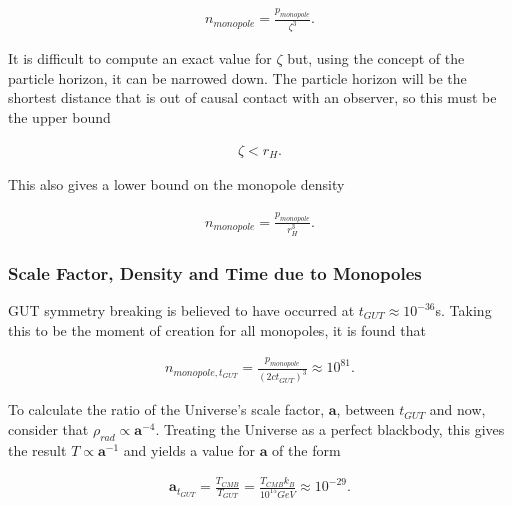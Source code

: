 \documentclass[fleqn, twocolumn, 10pt]{article}
\begin{document}
\begin{ceqn}
\begin{align*}
n_{monopole} = \frac{p_{monopole}}{\zeta^{3}}.
\end{align*}
\end{ceqn}

It is difficult to compute an exact value for $\zeta$ but, using the concept of the particle horizon, it can be narrowed down. The particle horizon will be the shortest distance that is out of causal contact with an observer, so this must be the upper bound

\begin{ceqn}
\begin{align*}
\zeta < r_H.
\end{align*}
\end{ceqn}
This also gives a lower bound on the monopole density

\begin{ceqn}
\begin{align*}
n_{monopole} = \frac{p_{monopole}}{r_H^3}.
\end{align*}
\end{ceqn}

\subsubsection{Scale Factor, Density and Time due to Monopoles}

GUT symmetry breaking is believed to have occurred at $t_{GUT}\approx10^{-36}$\:s. Taking this to be the moment of creation for all monopoles, it is found that

\begin{ceqn}
\begin{align*}
n_{monopole,t_{GUT}} = \frac{p_{monopole}}{(2ct_{GUT})^3} \approx 10^{81}.
\end{align*}
\end{ceqn}
To calculate the ratio of the Universe's scale factor, $\bm{a}$, between $t_{GUT}$ and now, consider that $\rho_{rad} \propto \bm{a}^{-4}$. Treating the Universe as a perfect blackbody, this gives the result $T \propto \bm{a}^{-1}$ and yields a value for $\bm{a}$ of the form \cite{liddle2015cosmo}

\begin{ceqn}
\begin{align*}
\bm{a}_{t_{GUT}} = \frac{T_{CMB}}{T_{GUT}} = \frac{T_{CMB}k_B}{10^{15}GeV} \approx 10^{-29}.
\end{align*}
\end{ceqn}
\end{document}
